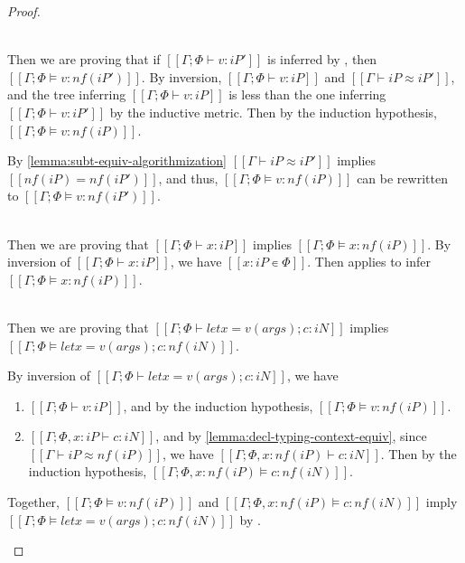 \begin{proof}
\begin{caseof}
        \item {}\\
            Then we are proving that
            if $[[Γ; Φ ⊢ v : iP']]$ is inferred by ,
            then $[[Γ; Φ ⊨ v : nf(iP')]]$.
            By inversion, $[[Γ ; Φ ⊢ v : iP]]$ and $[[Γ ⊢ iP ≈ iP']]$,
            and the tree inferring $[[Γ ; Φ ⊢ v : iP]]$ is less than the one 
            inferring $[[Γ; Φ ⊢ v : iP']]$ by the inductive metric.
            Then by the induction hypothesis, $[[Γ; Φ ⊨ v : nf(iP)]]$.

            By \cref{lemma:subt-equiv-algorithmization}
            $[[Γ ⊢ iP ≈ iP']]$ implies $[[nf(iP) = nf(iP')]]$, and thus, 
            $[[Γ; Φ ⊨ v : nf(iP)]]$ can be rewritten to $[[Γ; Φ ⊨ v : nf(iP')]]$.

        \item {}\\
            Then we are proving that
            $[[Γ; Φ ⊢ x : iP]]$
            implies
            $[[Γ; Φ ⊨ x : nf(iP)]]$.
            By inversion of $[[Γ; Φ ⊢ x : iP]]$,
            we have $[[x : iP ∊ Φ ]]$.
            Then  applies to infer
            $[[Γ; Φ ⊨ x : nf(iP)]]$.

        \item {}\\
            Then we are proving that
            $[[Γ; Φ ⊢ let x = v(args); c : iN]]$
            implies
            $[[Γ; Φ ⊨ let x = v(args); c : nf(iN)]]$.

            By inversion of
            $[[Γ; Φ ⊢ let x = v(args); c : iN]]$,
            we have
            \begin{enumerate}
                \item $[[Γ; Φ ⊢ v : iP]]$, 
                    and by the induction hypothesis,
                    $[[Γ; Φ ⊨ v : nf(iP)]]$.
                \item $[[Γ; Φ, x:iP ⊢ c : iN]]$,
                    and by \cref{lemma:decl-typing-context-equiv},
                    since $[[Γ ⊢ iP ≈ nf(iP)]]$, we have
                    $[[Γ; Φ, x:nf(iP) ⊢ c : iN]]$.
                    Then by the induction hypothesis, 
                    $[[Γ; Φ, x:nf(iP) ⊨ c : nf(iN)]]$.
            \end{enumerate}

            Together, $[[Γ; Φ ⊨ v : nf(iP)]]$ and $[[Γ; Φ, x:nf(iP) ⊨ c : nf(iN)]]$
            imply $[[Γ; Φ ⊨ let x = v(args); c : nf(iN)]]$ by .


\end{caseof}
\end{proof}
